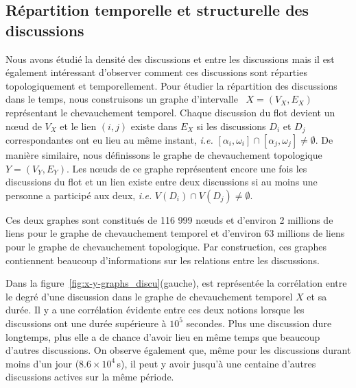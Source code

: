 \subsection{Répartition temporelle et structurelle des discussions}

Nous avons étudié la densité des discussions et entre les discussions mais il est également intéressant d'observer comment ces discussions sont réparties topologiquement et temporellement.
Pour étudier la répartition des discussions dans le temps, nous construisons un graphe d'intervalle~\cite{Lekkeikerker} $X=(V_X,E_X)$ représentant le chevauchement temporel.
Chaque discussion du flot devient un n\oe{}ud de $V_X$ et le lien $(i,j)$ existe dans $E_X$ si les discussions $D_i$ et $D_j$ correspondantes ont eu lieu au même instant, \emph{i.e.} $[\alpha_i, \omega_i] \cap [\alpha_j, \omega_j] \neq \emptyset$.
De manière similaire, nous définissons le graphe de chevauchement topologique $Y=(V_Y,E_Y)$.
Les n\oe{}uds de ce graphe représentent encore une fois les discussions du flot et un lien existe entre deux discussions si au moins une personne a participé aux deux, \emph{i.e.} $V(D_i) \cap V(D_j) \neq \emptyset$.

Ces deux graphes sont constitués de 116 999 n\oe{}uds et d'environ 2 millions de liens pour le graphe de chevauchement temporel et d'environ 63 millions de liens pour le graphe de chevauchement topologique.
Par construction, ces graphes contiennent beaucoup d'informations sur les relations entre les discussions.


Dans la figure~\ref{fig:x-y-graphs_discu}(gauche), est représentée la corrélation entre le degré d'une discussion dans le graphe de chevauchement temporel $X$ et sa durée.
Il y a une corrélation évidente entre ces deux notions lorsque les discussions ont une durée supérieure à $10^5$ secondes.
Plus une discussion dure longtemps, plus elle a de chance d'avoir lieu en même temps que beaucoup d'autres discussions.
On observe également que, même pour les discussions durant moins d'un jour ($8.6 \times 10^4$\,s), il peut y avoir jusqu'à une centaine d'autres discussions actives sur la même période.

